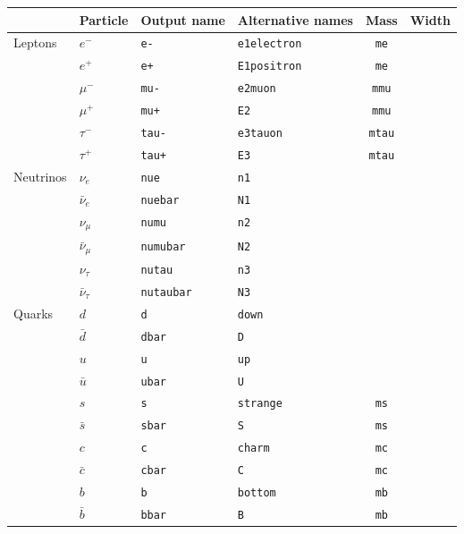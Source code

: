 \documentclass[12pt]{book}
\newcommand{\ttt}[1]{\texttt{#1}}
\begin{document}
\begin{table}[p]
  \begin{center}
    \begin{tabular}{|l|l|l|l|cc|}
      \hline
      & Particle & Output name & Alternative names & Mass & Width\\
      \hline\hline
      Leptons
      &$e^-$ & \verb|e-| & \ttt{e1}\quad\ttt{electron} & \ttt{me} & \\
      &$e^+$ & \verb|e+| & \ttt{E1}\quad\ttt{positron} & \ttt{me} & \\
      \hline
      &$\mu^-$ & \verb|mu-| & \ttt{e2}\quad\ttt{muon} & \ttt{mmu} & \\
      &$\mu^+$ & \verb|mu+| & \ttt{E2} & \ttt{mmu} & \\
      \hline
      &$\tau^-$ & \verb|tau-| & \ttt{e3}\quad\ttt{tauon} & \ttt{mtau} & \\
      &$\tau^+$ & \verb|tau+| & \ttt{E3} & \ttt{mtau} & \\
      \hline\hline
      Neutrinos
      &$\nu_e$ & \verb|nue| & \ttt{n1} & & \\
      &$\bar\nu_e$ & \verb|nuebar| & \ttt{N1} & & \\
      \hline
      &$\nu_\mu$ & \verb|numu| & \ttt{n2} & & \\
      &$\bar\nu_\mu$ & \verb|numubar| & \ttt{N2} & & \\
      \hline
      &$\nu_\tau$ & \verb|nutau| & \ttt{n3} & & \\
      &$\bar\nu_\tau$ & \verb|nutaubar| & \ttt{N3} & & \\
      \hline\hline
      Quarks
      &$d$ & \verb|d| & \ttt{down} & & \\
      &$\bar d$ & \verb|dbar| & \ttt{D} & & \\
      \hline
      &$u$ & \verb|u| & \ttt{up} & & \\
      &$\bar u$ & \verb|ubar| & \ttt{U} & & \\
      \hline
      &$s$ & \verb|s| & \ttt{strange} & \ttt{ms} & \\
      &$\bar s$ & \verb|sbar| & \ttt{S} & \ttt{ms}  & \\
      \hline
      &$c$ & \verb|c| & \ttt{charm} & \ttt{mc}  & \\
      &$\bar c$ & \verb|cbar| & \ttt{C} & \ttt{mc} & \\
      \hline
      &$b$ & \verb|b| & \ttt{bottom} & \ttt{mb} & \\
      &$\bar b$ & \verb|bbar| & \ttt{B} &  \ttt{mb} & \\

\end{tabular}
\end{center}
\end{table}
\end{document}
